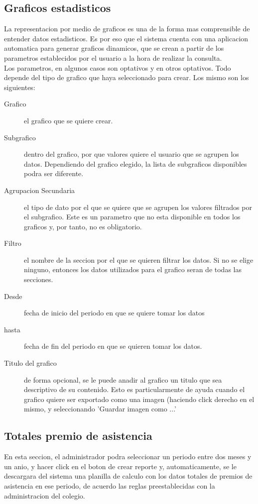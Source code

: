 \documentclass[12pt,a4paper]{article}
\begin{document}
\subsection{Graficos estadisticos}
La representacion por medio de graficos es una de la forma mas comprensible de entender datos estadisticos. Es por eso que el sistema cuenta con una aplicacion automatica para generar graficos dinamicos, que se crean a partir de los parametros establecidos por el usuario a la hora de realizar la consulta. \\
Los parametros, en algunos casos son optativos y en otros optativos. Todo depende del tipo de grafico que haya seleccionado para crear. Los mismo son los siguientes:
\begin{description}
\item[Grafico] el grafico que se quiere crear.
\item[Subgrafico] dentro del grafico, por que valores quiere el usuario que se agrupen los datos. Dependiendo del grafico elegido, la lista de subgraficos disponibles podra ser diferente.
\item[Agrupacion Secundaria] el tipo de dato por el que se quiere que se agrupen los valores filtrados por el subgrafico. Este es un parametro que no esta disponible en todos los graficos y, por tanto, no es obligatorio.
\item[Filtro] el nombre de la seccion por el que se quieren filtrar los datos. Si no se elige ninguno, entonces los datos utilizados para el grafico seran de todas las secciones.
\item[Desde] fecha de inicio del periodo en que se quiere tomar los datos
\item[hasta] fecha de fin del periodo en que se quieren tomar los datos.
\item[Titulo del grafico] de  forma opcional, se le puede anadir al grafico un titulo que sea descriptivo de su contenido. Esto es particularmente de ayuda cuando el grafico quiere ser exportado como una imagen (haciendo click derecho en el mismo, y seleccionando 'Guardar imagen como ...'
\end{description}

\subsection{Totales premio de asistencia}
En esta seccion, el administrador podra seleccionar un periodo entre dos meses y un anio, y hacer click en el boton de crear reporte y, automaticamente, se le descargara del sistema una planilla de calculo con los datos totales de premios de asistencia en ese periodo, de acuerdo las reglas preestablecidas con la administracion del colegio. \\
\end{document}
